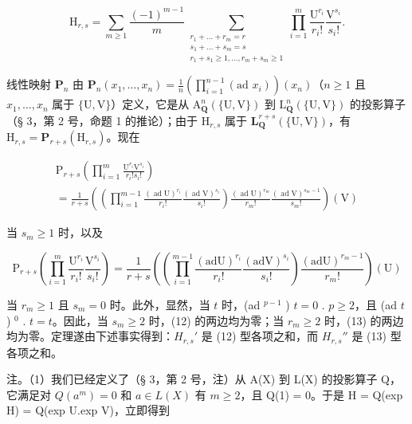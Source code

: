 \[
\mathrm{H}_{r,s} = \sum_{m\geqslant 1}\frac{(-1)^{m - 1}}{m}\sum_{\substack{r_{1} + \dots +r_{m} = r\\ s_{1} + \dots +s_{m} = s\\ r_{1} + s_{1}\geqslant 1,\ldots ,r_{m} + s_{m}\geqslant 1}}\prod_{i = 1}^{m}\frac{\mathrm{U}^{r_{i}}}{r_{i}!}\frac{\mathrm{V}^{s_{i}}}{s_{i}!}.\tag{11}
\]

线性映射 \(\mathbf{P}_n\) 由 \(\mathbf{P}_n(x_1, \ldots, x_n) = \frac{1}{n} \left( \prod_{i=1}^{n-1} (\text{ad } x_i) \right)(x_n)\)（\(n \geqslant 1\) 且 \(x_1, \ldots, x_n\) 属于 \(\{\mathrm{U}, \mathrm{V}\}\)）定义，它是从 \(\mathrm{A}_{\mathbf{Q}}^n(\{\mathrm{U}, \mathrm{V}\})\) 到 \(\mathrm{L}_{\mathbf{Q}}^n(\{\mathrm{U}, \mathrm{V}\})\) 的投影算子（§ 3，第 2 号，命题 1 的推论）；由于 \(\mathrm{H}_{r,s}\) 属于 \(\mathbf{L}_{\mathbf{Q}}^{r+s}(\{\mathrm{U}, \mathrm{V}\})\)，有 \(\mathrm{H}_{r,s} = \mathbf{P}_{r+s}(\mathrm{H}_{r,s})\)。现在

\[
\begin{array}{l} \mathrm{P} _ {r + s} \left(\prod_ {i = 1} ^ {m} \frac {\mathrm{U} ^ {r _ {i}} \mathrm{V} ^ {s _ {i}}}{r _ {i} ! s _ {i} !}\right) \\ = \frac {1}{r + s} \left(\left(\prod_ {i = 1} ^ {m - 1} \frac {(\operatorname{ad} \mathrm{U}) ^ {r _ {i}}}{r _ {i} !} \frac {(\operatorname{ad} \mathrm{V}) ^ {s _ {i}}}{s _ {i} !}\right) \frac {(\operatorname{ad} \mathrm{U}) ^ {r _ {m}}}{r _ {m} !} \frac {(\operatorname{ad} \mathrm{V}) ^ {s _ {m} - 1}}{s _ {m} !}\right) (\mathrm{V}) \end{array}\tag{12}
\]

当 \(s_m \geqslant 1\) 时，以及

\[
\mathrm{P} _ {r + s} \left(\prod_ {i = 1} ^ {m} \frac {\mathrm{U} ^ {r _ {i}}}{r _ {i} !} \frac {\mathrm{V} ^ {s _ {i}}}{s _ {i} !}\right) = \frac {1}{r + s} \left(\left(\prod_ {i = 1} ^ {m - 1} \frac {(\mathrm{adU}) ^ {r _ {i}}}{r _ {i} !} \frac {(\mathrm{adV}) ^ {s _ {i}}}{s _ {i} !}\right) \frac {(\mathrm{adU}) ^ {r _ {m} - 1}}{r _ {m} !}\right) (\mathrm{U})\tag{13}
\]

当 \(r_m \geqslant 1\) 且 \(s_m = 0\) 时。此外，显然，当 \(t\) 时，(ad \(^{p-1}\) ) \(t = 0\) . \(p \geqslant 2\)，且 (ad \(t\) ) \(^0\) . \(t = t\)。因此，当 \(s_m \geqslant 2\) 时，(12) 的两边均为零；当 \(r_m \geqslant 2\) 时，(13) 的两边均为零。定理遂由下述事实得到：\(H_{r,s}'\) 是 (12) 型各项之和，而 \(H_{r,s}''\) 是 (13) 型各项之和。

注。（1）我们已经定义了（§ 3，第 2 号，注）从 A(X) 到 L(X) 的投影算子 Q，它满足对 \(Q(a^{m}) = 0\) 和 \(a \in L(X)\) 有 \(m \geqslant 2\)，且 Q(1) = 0。于是 H = Q(exp H) = Q(exp U.exp V)，立即得到

